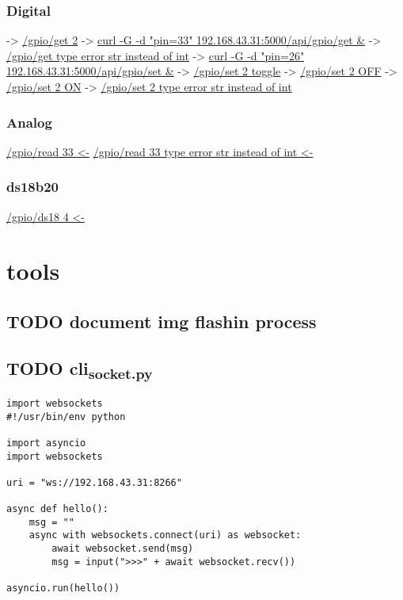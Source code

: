 \documentclass[11pt]{article}
\begin{document}
\subsubsection{Digital}
\label{sec:orgf0ad521}
-> \href{curl -G -d "pin=2" 192.168.43.31:5000/api/gpio/get \&}{/gpio/get 2}
-> \url{curl -G -d "pin=33" 192.168.43.31:5000/api/gpio/get \&}
-> \href{curl -G -d "pin=two" 192.168.43.31:5000/api/gpio/get \&}{/gpio/get type error str instead of int}
-> \url{curl -G -d "pin=26" 192.168.43.31:5000/api/gpio/set \&}
-> \href{curl -G -d "pin=2" 192.168.43.31:5000/api/gpio/set \&}{/gpio/set 2 toggle}
-> \href{curl -G -d "pin=2" -d "value=0" 192.168.43.31:5000/api/gpio/set \&}{/gpio/set 2 OFF}
-> \href{curl -G -d "pin=2" -d "value=1" 192.168.43.31:5000/api/gpio/set \&}{/gpio/set 2 ON}
-> \href{curl -G -d "pin=two" -d "value=1" 192.168.43.31:5000/api/gpio/set \&}{/gpio/set 2 type error str instead of int}
\subsubsection{Analog}
\label{sec:orgb3ec042}
\href{curl -G -d "pin=33"  192.168.43.31:5000/api/gpio/read \&}{/gpio/read 33 <-}
\href{curl -G -d "pin=two" 192.168.43.31:5000/api/gpio/read \&}{/gpio/read 33 type error str instead of int <-}
\subsubsection{ds18b20}
\label{sec:orgb040303}
\href{curl -G -d "pin=4"  192.168.43.31:5000/api/gpio/ds18 \&}{/gpio/ds18 4 <-}

\section{tools}
\label{sec:org54f83e3}
\subsection{{\bfseries\sffamily TODO} document img flashin process}
\label{sec:orgb2f6450}
\subsection{{\bfseries\sffamily TODO} cli\textsubscript{socket.py}}
\label{sec:org86a04fc}
\begin{verbatim}
import websockets
#!/usr/bin/env python

import asyncio
import websockets

uri = "ws://192.168.43.31:8266"

async def hello():
    msg = ""
    async with websockets.connect(uri) as websocket:
        await websocket.send(msg)
        msg = input(">>>" + await websocket.recv())

asyncio.run(hello())
\end{verbatim}
\end{document}
